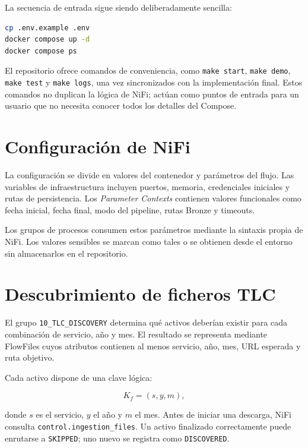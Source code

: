 La secuencia de entrada sigue siendo deliberadamente sencilla:

\begin{lstlisting}[language=bash,caption={Secuencia conceptual de inicialización.}]
cp .env.example .env
docker compose up -d
docker compose ps
\end{lstlisting}

El repositorio ofrece comandos de conveniencia, como \texttt{make start}, \texttt{make demo}, \texttt{make test} y \texttt{make logs}, una vez sincronizados con la implementación final. Estos comandos no duplican la lógica de NiFi; actúan como puntos de entrada para un usuario que no necesita conocer todos los detalles del Compose.

\section{Configuración de NiFi}

La configuración se divide en valores del contenedor y parámetros del flujo. Las variables de infraestructura incluyen puertos, memoria, credenciales iniciales y rutas de persistencia. Los \textit{Parameter Contexts} contienen valores funcionales como fecha inicial, fecha final, modo del pipeline, rutas Bronze y timeouts.

Los grupos de procesos consumen estos parámetros mediante la sintaxis propia de NiFi. Los valores sensibles se marcan como tales o se obtienen desde el entorno sin almacenarlos en el repositorio.

\section{Descubrimiento de ficheros TLC}

El grupo \texttt{10\_TLC\_DISCOVERY} determina qué activos deberían existir para cada combinación de servicio, año y mes. El resultado se representa mediante FlowFiles cuyos atributos contienen al menos servicio, año, mes, URL esperada y ruta objetivo.

Cada activo dispone de una clave lógica:

\begin{equation}
K_f = (s,y,m),
\end{equation}

donde \(s\) es el servicio, \(y\) el año y \(m\) el mes. Antes de iniciar una descarga, NiFi consulta \texttt{control.ingestion\_files}. Un activo finalizado correctamente puede enrutarse a \texttt{SKIPPED}; uno nuevo se registra como \texttt{DISCOVERED}.

